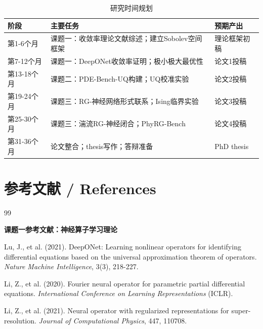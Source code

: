 \documentclass[12pt,a4paper,twoside]{article}
\begin{document}
\begin{inversation}
\begin{table}[h]
    \centering
    \caption{研究时间规划}
    \begin{tabular}{p{3cm}p{4cm}p{3cm}}
        \toprule
        \textbf{阶段} & \textbf{主要任务} & \textbf{预期产出} \\
        \midrule
        第1-6个月 & 课题一：收敛率理论文献综述；建立Sobolev空间框架 & 理论框架初稿 \\
        第7-12个月 & 课题一：DeepONet收敛率证明；极小极大最优性 & 论文1投稿 \\
        第13-18个月 & 课题二：PDE-Bench-UQ构建；UQ校准实验 & 论文2投稿 \\
        第19-24个月 & 课题三：RG-神经网络形式联系；Ising临界实验 & 论文3投稿 \\
        第25-30个月 & 课题三：湍流RG-神经闭合；PhyRG-Bench & 论文4投稿 \\
        第31-36个月 & 论文整合；thesis写作；答辩准备 & PhD thesis \\
        \bottomrule
    \end{tabular}
\end{table}

\clearpage

\section{参考文献 / References}

\begin{thebibliography}{99}

\vspace{0.3cm}
\noindent\textbf{课题一参考文献：神经算子学习理论}

\vspace{0.2cm}
\noindent[1] Lu, J., et al. (2021). DeepONet: Learning nonlinear operators for identifying differential equations based on the universal approximation theorem of operators. \textit{Nature Machine Intelligence}, 3(3), 218-227.

\vspace{0.2cm}
\noindent[2] Li, Z., et al. (2020). Fourier neural operator for parametric partial differential equations. \textit{International Conference on Learning Representations} (ICLR).

\vspace{0.2cm}
\noindent[3] Li, Z., et al. (2021). Neural operator with regularized representations for super-resolution. \textit{Journal of Computational Physics}, 447, 110708.


\end{thebibliography}
\end{inversation}
\end{document}

